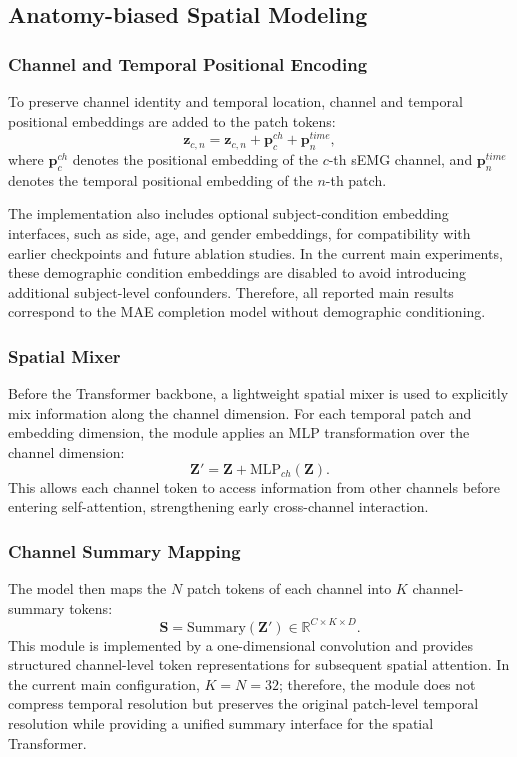 \documentclass[journal]{IEEEtran}
\begin{document}
\subsection{Anatomy-biased Spatial Modeling}
\subsubsection{Channel and Temporal Positional Encoding}
To preserve channel identity and temporal location, channel and temporal positional embeddings are added to the patch tokens:
\begin{equation}
\mathbf{z}_{c,n} = \mathbf{z}_{c,n} + \mathbf{p}^{ch}_{c} + \mathbf{p}^{time}_{n},
\end{equation}
where $\mathbf{p}^{ch}_{c}$ denotes the positional embedding of the $c$-th sEMG channel, and $\mathbf{p}^{time}_{n}$ denotes the temporal positional embedding of the $n$-th patch.

The implementation also includes optional subject-condition embedding interfaces, such as side, age, and gender embeddings, for compatibility with earlier checkpoints and future ablation studies. In the current main experiments, these demographic condition embeddings are disabled to avoid introducing additional subject-level confounders. Therefore, all reported main results correspond to the MAE completion model without demographic conditioning.

\subsubsection{Spatial Mixer}
Before the Transformer backbone, a lightweight spatial mixer is used to explicitly mix information along the channel dimension. For each temporal patch and embedding dimension, the module applies an MLP transformation over the channel dimension:
\begin{equation}
\mathbf{Z}' = \mathbf{Z} + \mathrm{MLP}_{ch}(\mathbf{Z}).
\end{equation}
This allows each channel token to access information from other channels before entering self-attention, strengthening early cross-channel interaction.

\subsubsection{Channel Summary Mapping}
The model then maps the $N$ patch tokens of each channel into $K$ channel-summary tokens:
\begin{equation}
\mathbf{S} = \mathrm{Summary}(\mathbf{Z}') \in \mathbb{R}^{C \times K \times D}.
\end{equation}
This module is implemented by a one-dimensional convolution and provides structured channel-level token representations for subsequent spatial attention. In the current main configuration, $K=N=32$; therefore, the module does not compress temporal resolution but preserves the original patch-level temporal resolution while providing a unified summary interface for the spatial Transformer.
\end{document}
